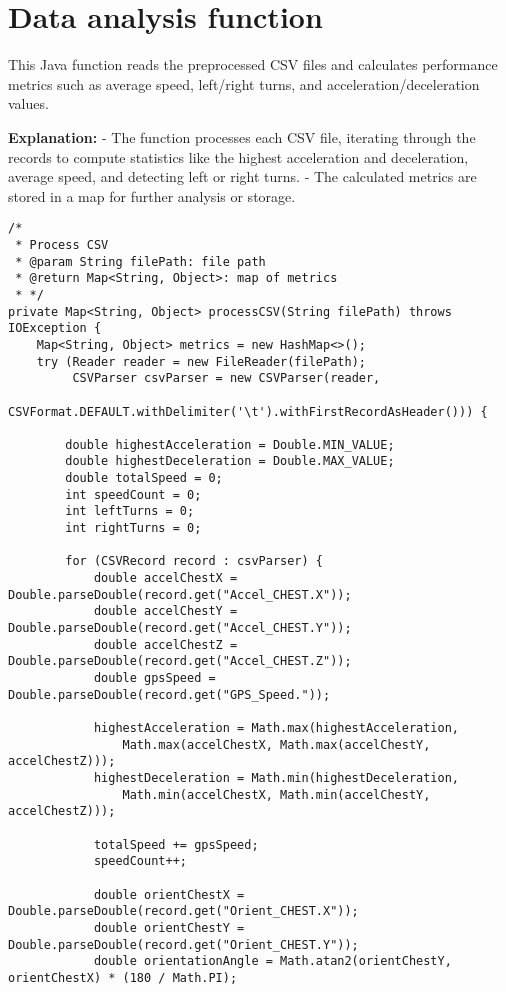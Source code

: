 \section{Data analysis function}
\label{sec:analysis_fun}

This Java function reads the preprocessed CSV files and calculates performance metrics such as average speed, left/right turns, and acceleration/deceleration values.

\textbf{Explanation:}  
- The function processes each CSV file, iterating through the records to compute statistics like the highest acceleration and deceleration, average speed, and detecting left or right turns.  
- The calculated metrics are stored in a map for further analysis or storage.

\begin{verbatim}
/*
 * Process CSV
 * @param String filePath: file path
 * @return Map<String, Object>: map of metrics
 * */
private Map<String, Object> processCSV(String filePath) throws IOException {
    Map<String, Object> metrics = new HashMap<>();
    try (Reader reader = new FileReader(filePath);
         CSVParser csvParser = new CSVParser(reader,
            CSVFormat.DEFAULT.withDelimiter('\t').withFirstRecordAsHeader())) {

        double highestAcceleration = Double.MIN_VALUE;
        double highestDeceleration = Double.MAX_VALUE;
        double totalSpeed = 0;
        int speedCount = 0;
        int leftTurns = 0;
        int rightTurns = 0;

        for (CSVRecord record : csvParser) {
            double accelChestX = Double.parseDouble(record.get("Accel_CHEST.X"));
            double accelChestY = Double.parseDouble(record.get("Accel_CHEST.Y"));
            double accelChestZ = Double.parseDouble(record.get("Accel_CHEST.Z"));
            double gpsSpeed = Double.parseDouble(record.get("GPS_Speed."));

            highestAcceleration = Math.max(highestAcceleration, 
                Math.max(accelChestX, Math.max(accelChestY, accelChestZ)));
            highestDeceleration = Math.min(highestDeceleration,
                Math.min(accelChestX, Math.min(accelChestY, accelChestZ)));

            totalSpeed += gpsSpeed;
            speedCount++;

            double orientChestX = Double.parseDouble(record.get("Orient_CHEST.X"));
            double orientChestY = Double.parseDouble(record.get("Orient_CHEST.Y"));
            double orientationAngle = Math.atan2(orientChestY, orientChestX) * (180 / Math.PI);


\end{verbatim}
